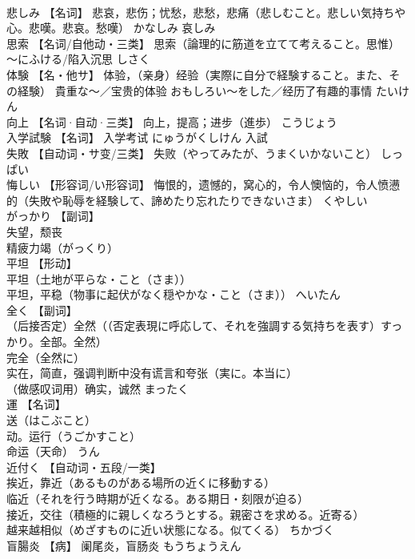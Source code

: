 \documentclass[8pt]{extreport}
\begin{document}
\begin{CJK}{UTF8}{min}
\\	悲しみ	【名词】 悲哀，悲伤；忧愁，悲愁，悲痛（悲しむこと。悲しい気持ちや心。悲嘆。悲哀。愁嘆）	かなしみ	哀しみ
\\	思索	【名词/自他动・三类】 思索（論理的に筋道を立てて考えること。思惟） 〜にふける/陷入沉思	しさく	
\\	体験	【名・他サ】 体验，（亲身）经验（実際に自分で経験すること。また、その経験） 貴重な〜／宝贵的体验 おもしろい〜をした／经历了有趣的事情	たいけん	
\\	向上	【名词·自动·三类】 向上，提高；进步（進歩）	こうじょう	
\\	入学試験	【名词】 入学考试	にゅうがくしけん	入試
\\	失敗	【自动词・サ变/三类】 失败（やってみたが、うまくいかないこと）	しっぱい	
\\	悔しい	【形容词/い形容词】 悔恨的，遗憾的，窝心的，令人懊恼的，令人愤懑的（失敗や恥辱を経験して、諦めたり忘れたりできないさま）	くやしい	
\\	がっかり	【副词】 
\\	失望，颓丧 
\\	精疲力竭（がっくり）		
\\	平坦	【形动】 
\\	平坦（土地が平らな・こと（さま）） 
\\	平坦，平稳（物事に起伏がなく穏やかな・こと（さま））	へいたん	
\\	全く	【副词】 
\\	（后接否定）全然（（否定表現に呼応して、それを強調する気持ちを表す）すっかり。全部。全然） 
\\	完全（全然に） 
\\	实在，简直，强调判断中没有谎言和夸张（実に。本当に） 
\\	（做感叹词用）确实，诚然	まったく	
\\	運	【名词】 
\\	送（はこぶこと） 
\\	动。运行（うごかすこと） 
\\	命运（天命）	うん	
\\	近付く	【自动词・五段/一类】 
\\	挨近，靠近（あるものがある場所の近くに移動する） 
\\	临近（それを行う時期が近くなる。ある期日・刻限が迫る） 
\\	接近，交往（積極的に親しくなろうとする。親密さを求める。近寄る） 
\\	越来越相似（めざすものに近い状態になる。似てくる）	ちかづく	
\\	盲腸炎	【病】 阑尾炎，盲肠炎	もうちょうえん	

\end{CJK}
\end{document}
